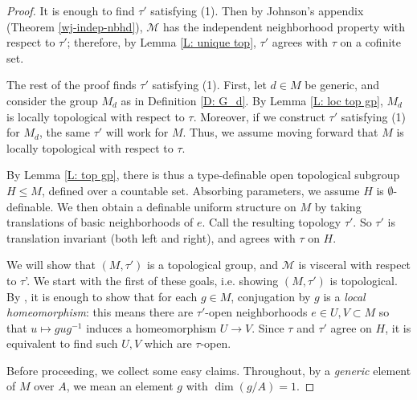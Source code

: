 \documentclass{amsart}
\theoremstyle{definition}
\begin{document}
\begin{proof}
    It is enough to find $\tau'$ satisfying (1). Then by Johnson's appendix (Theorem \ref{wj-indep-nbhd}), $\mathcal M$ has the independent neighborhood property with respect to $\tau'$; therefore, by Lemma \ref{L: unique top}, $\tau'$ agrees with $\tau$ on a cofinite set.

    The rest of the proof finds $\tau'$ satisfying (1). First, let $d\in M$ be generic, and consider the group $M_d$ as in Definition \ref{D: G_d}. By Lemma \ref{L: loc top gp}, $M_d$ is locally topological with respect to $\tau$. Moreover, if we construct $\tau'$ satisfying (1) for $M_d$, the same $\tau'$ will work for $M$. Thus, we assume moving forward that $M$ is locally topological with respect to $\tau$.
    
    By Lemma \ref{L: top gp}, there is thus a type-definable open topological subgroup $H\leq M$, defined over a countable set. Absorbing parameters, we assume $H$ is $\emptyset$-definable. We then obtain a definable uniform structure on $M$ by taking translations of basic neighborhoods of $e$. Call the resulting topology $\tau'$. So $\tau'$ is translation invariant (both left and right), and agrees with $\tau$ on $H$.
    
    We will show that $(M,\tau')$ is a topological group, and $\mathcal M$ is visceral with respect to $\tau$'. We start with the first of these goals, i.e. showing $(M,\tau')$ is topological. By \cite[Lemma 2.11]{HaHaPeGps}, it is enough to show that for each $g\in M$, conjugation by $g$ is a \textit{local homeomorphism}: this means there are $\tau'$-open neighborhoods $e\in U,V\subset M$ so that $u\mapsto gug^{-1}$ induces a homeomorphism $U\rightarrow V$. Since $\tau$ and $\tau'$ agree on $H$, it is equivalent to find such $U,V$ which are $\tau$-open.
    
    Before proceeding, we collect some easy claims. Throughout, by a \textit{generic} element of $M$ over $A$, we mean an element $g$ with $\dim(g/A)=1$. 
    

\end{proof}
\end{document}
